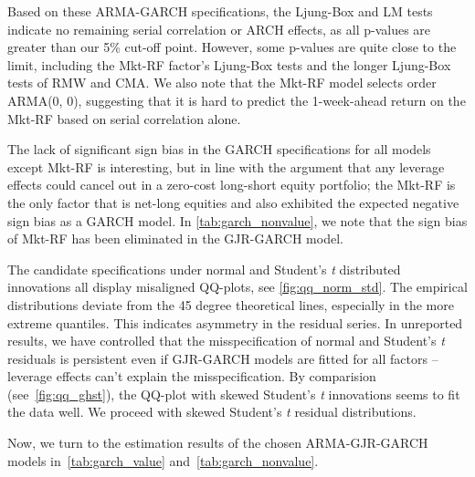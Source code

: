 Based on these ARMA-GARCH specifications, the Ljung-Box and LM tests indicate no remaining serial correlation or ARCH effects, as all p-values are greater than our 5\% cut-off point. However, some p-values are quite close to the limit, including the Mkt-RF factor's Ljung-Box tests and the longer Ljung-Box tests of RMW and CMA. We also note that the Mkt-RF model selects order ARMA(0, 0), suggesting that it is hard to predict the 1-week-ahead return on the Mkt-RF based on serial correlation alone.

The lack of significant sign bias in the GARCH specifications for all models except Mkt-RF is interesting, but in line with the argument that any leverage effects could cancel out in a zero-cost long-short equity portfolio; the Mkt-RF is the only factor that is net-long equities and also exhibited the expected negative sign bias as a GARCH model. In \autoref{tab:garch_nonvalue}, we note that the sign bias of Mkt-RF has been eliminated in the GJR-GARCH model. 

The candidate specifications under normal and Student's \textit{t} distributed innovations all display misaligned QQ-plots, see \autoref{fig:qq_norm_std}. The empirical distributions deviate from the 45 degree theoretical lines, especially in the more extreme quantiles. This indicates asymmetry in the residual series. In unreported results, we have controlled that the misspecification of normal and Student's \textit{t} residuals is persistent even if GJR-GARCH models are fitted for all factors -- leverage effects can't explain the misspecification. By comparision (see~\autoref{fig:qq_ghst}), the QQ-plot with skewed Student's \textit{t} innovations seems to fit the data well. We proceed with skewed Student's \textit{t} residual distributions.

Now, we turn to the estimation results of the chosen ARMA-GJR-GARCH models in~\autoref{tab:garch_value} and~\autoref{tab:garch_nonvalue}. 

